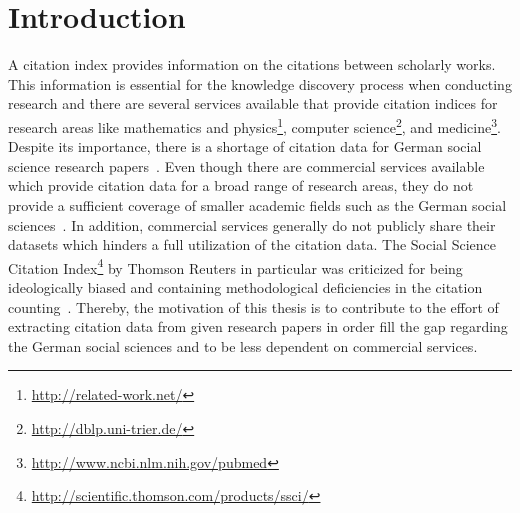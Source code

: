 \chapter{Introduction}\label{cha:introduction}


A citation index provides information on the citations between scholarly works.
This information is essential for the knowledge discovery process when conducting research and there are several services available that provide citation indices for research areas like mathematics and physics\footnote{\url{http://related-work.net/}}, computer science\footnote{\url{http://dblp.uni-trier.de/}}, and medicine\footnote{\url{http://www.ncbi.nlm.nih.gov/pubmed}}.
Despite its importance, there is a shortage of citation data for German social science research papers~\citep{herb2015open}.
Even though there are commercial services available which provide citation data for a broad range of research areas, they do not provide a sufficient coverage of smaller academic fields such as the German social sciences~\citep{mayr2007exploratory}.
In addition, commercial services generally do not publicly share their datasets which hinders a full utilization of the citation data.
The Social Science Citation Index\footnote{\url{http://scientific.thomson.com/products/ssci/}} by Thomson Reuters in particular was criticized for being ideologically biased and containing methodological deficiencies in the citation counting~\cite{klein2004social}.
Thereby, the motivation of this thesis is to contribute to the effort of extracting citation data from given research papers in order fill the gap regarding the German social sciences and to be less dependent on commercial services.

\bigskip


